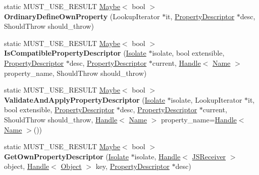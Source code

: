 \begin{DoxyCompactItemize}
\item 
static M\+U\+S\+T\+\_\+\+U\+S\+E\+\_\+\+R\+E\+S\+U\+LT \hyperlink{classv8_1_1_maybe}{Maybe}$<$ bool $>$ {\bfseries Ordinary\+Define\+Own\+Property} (Lookup\+Iterator $\ast$it, \hyperlink{classv8_1_1internal_1_1_property_descriptor}{Property\+Descriptor} $\ast$desc, Should\+Throw should\+\_\+throw)\hypertarget{classv8_1_1internal_1_1_j_s_receiver_ab16691aca7b9aec02c7ded71897271c0}{}\label{classv8_1_1internal_1_1_j_s_receiver_ab16691aca7b9aec02c7ded71897271c0}

\item 
static M\+U\+S\+T\+\_\+\+U\+S\+E\+\_\+\+R\+E\+S\+U\+LT \hyperlink{classv8_1_1_maybe}{Maybe}$<$ bool $>$ {\bfseries Is\+Compatible\+Property\+Descriptor} (\hyperlink{classv8_1_1internal_1_1_isolate}{Isolate} $\ast$isolate, bool extensible, \hyperlink{classv8_1_1internal_1_1_property_descriptor}{Property\+Descriptor} $\ast$desc, \hyperlink{classv8_1_1internal_1_1_property_descriptor}{Property\+Descriptor} $\ast$current, \hyperlink{classv8_1_1internal_1_1_handle}{Handle}$<$ \hyperlink{classv8_1_1internal_1_1_name}{Name} $>$ property\+\_\+name, Should\+Throw should\+\_\+throw)\hypertarget{classv8_1_1internal_1_1_j_s_receiver_addf56507b21a2ca1aa9c19d37cfa514e}{}\label{classv8_1_1internal_1_1_j_s_receiver_addf56507b21a2ca1aa9c19d37cfa514e}

\item 
static M\+U\+S\+T\+\_\+\+U\+S\+E\+\_\+\+R\+E\+S\+U\+LT \hyperlink{classv8_1_1_maybe}{Maybe}$<$ bool $>$ {\bfseries Validate\+And\+Apply\+Property\+Descriptor} (\hyperlink{classv8_1_1internal_1_1_isolate}{Isolate} $\ast$isolate, Lookup\+Iterator $\ast$it, bool extensible, \hyperlink{classv8_1_1internal_1_1_property_descriptor}{Property\+Descriptor} $\ast$desc, \hyperlink{classv8_1_1internal_1_1_property_descriptor}{Property\+Descriptor} $\ast$current, Should\+Throw should\+\_\+throw, \hyperlink{classv8_1_1internal_1_1_handle}{Handle}$<$ \hyperlink{classv8_1_1internal_1_1_name}{Name} $>$ property\+\_\+name=\hyperlink{classv8_1_1internal_1_1_handle}{Handle}$<$ \hyperlink{classv8_1_1internal_1_1_name}{Name} $>$())\hypertarget{classv8_1_1internal_1_1_j_s_receiver_ad71787f677a19dda3aab56059549a2d4}{}\label{classv8_1_1internal_1_1_j_s_receiver_ad71787f677a19dda3aab56059549a2d4}

\item 
static M\+U\+S\+T\+\_\+\+U\+S\+E\+\_\+\+R\+E\+S\+U\+LT \hyperlink{classv8_1_1_maybe}{Maybe}$<$ bool $>$ {\bfseries Get\+Own\+Property\+Descriptor} (\hyperlink{classv8_1_1internal_1_1_isolate}{Isolate} $\ast$isolate, \hyperlink{classv8_1_1internal_1_1_handle}{Handle}$<$ \hyperlink{classv8_1_1internal_1_1_j_s_receiver}{J\+S\+Receiver} $>$ object, \hyperlink{classv8_1_1internal_1_1_handle}{Handle}$<$ \hyperlink{classv8_1_1internal_1_1_object}{Object} $>$ key, \hyperlink{classv8_1_1internal_1_1_property_descriptor}{Property\+Descriptor} $\ast$desc)\hypertarget{classv8_1_1internal_1_1_j_s_receiver_abbed2cea1b65a706e3b1c5600837e5eb}{}\label{classv8_1_1internal_1_1_j_s_receiver_abbed2cea1b65a706e3b1c5600837e5eb}


\end{DoxyCompactItemize}
